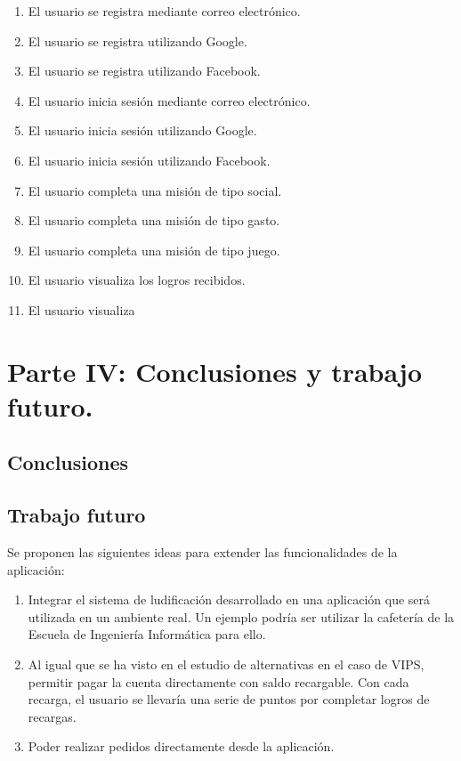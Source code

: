\documentclass[twoside]{report}
\begin{document}
\begin{enumerate}

\item El usuario se registra mediante correo electrónico.
\item El usuario se registra utilizando Google.
\item El usuario se registra utilizando Facebook.
\item El usuario inicia sesión mediante correo electrónico.
\item El usuario inicia sesión utilizando Google.
\item El usuario inicia sesión utilizando Facebook.
\item El usuario completa una misión de tipo social.
\item El usuario completa una misión de tipo gasto.
\item El usuario completa una misión de tipo juego.
\item El usuario visualiza los logros recibidos.
\item El usuario visualiza 
\end{enumerate}


\chapter{Parte IV: Conclusiones y trabajo futuro.}
\section{Conclusiones}
\section{Trabajo futuro}

Se proponen las siguientes ideas para extender las funcionalidades de la aplicación:

\begin{enumerate}
\item Integrar el sistema de ludificación desarrollado en una aplicación que será utilizada en un ambiente real. Un ejemplo podría ser utilizar la cafetería de la Escuela de Ingeniería Informática para ello.

\item Al igual que se ha visto en el estudio de alternativas en el caso de VIPS, permitir pagar la cuenta directamente con saldo recargable. Con cada recarga, el usuario se llevaría una serie de puntos por completar logros de recargas.

\item Poder realizar pedidos directamente desde la aplicación.
\end{enumerate}
\end{document}
